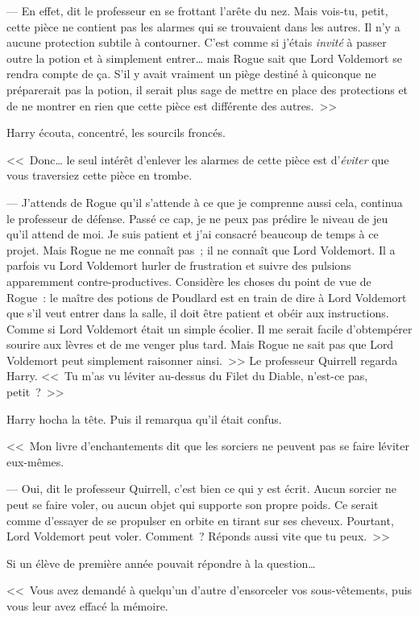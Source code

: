 --- En effet, dit le professeur en se frottant l'arête du nez. Mais vois-tu, petit, cette pièce ne contient pas les alarmes qui se trouvaient dans les autres. Il n'y a aucune protection subtile à contourner. C'est comme si j'étais \emph{invité} à passer outre la potion et à simplement entrer… mais Rogue sait que Lord Voldemort se rendra compte de ça. S'il y avait vraiment un piège destiné à quiconque ne préparerait pas la potion, il serait plus sage de mettre en place des protections et de ne montrer en rien que cette pièce est différente des autres.~>>

Harry écouta, concentré, les sourcils froncés.

<<~Donc… le seul intérêt d'enlever les alarmes de cette pièce est d'\emph{éviter} que vous traversiez cette pièce en trombe.

--- J'attends de Rogue qu'il s'attende à ce que je comprenne aussi cela, continua le professeur de défense. Passé ce cap, je ne peux pas prédire le niveau de jeu qu'il attend de moi. Je suis patient et j'ai consacré beaucoup de temps à ce projet. Mais Rogue ne me connaît pas~; il ne connaît que Lord Voldemort. Il a parfois vu Lord Voldemort hurler de frustration et suivre des pulsions apparemment contre-productives. Considère les choses du point de vue de Rogue~: le maître des potions de Poudlard est en train de dire à Lord Voldemort que s'il veut entrer dans la salle, il doit être patient et obéir aux instructions. Comme si Lord Voldemort était un simple écolier. Il me serait facile d'obtempérer sourire aux lèvres et de me venger plus tard. Mais Rogue ne sait pas que Lord Voldemort peut simplement raisonner ainsi.~>> Le professeur Quirrell regarda Harry. <<~Tu m'as vu léviter au-dessus du Filet du Diable, n'est-ce pas, petit~?~>>

Harry hocha la tête. Puis il remarqua qu'il était confus.

<<~Mon livre d'enchantements dit que les sorciers ne peuvent pas se faire léviter eux-mêmes.

--- Oui, dit le professeur Quirrell, c'est bien ce qui y est écrit. Aucun sorcier ne peut se faire voler, ou aucun objet qui supporte son propre poids. Ce serait comme d'essayer de se propulser en orbite en tirant sur ses cheveux. Pourtant, Lord Voldemort peut voler. Comment~? Réponds aussi vite que tu peux.~>>

Si un élève de première année pouvait répondre à la question…

<<~Vous avez demandé à quelqu'un d'autre d'ensorceler vos sous-vêtements, puis vous leur avez effacé la mémoire.

